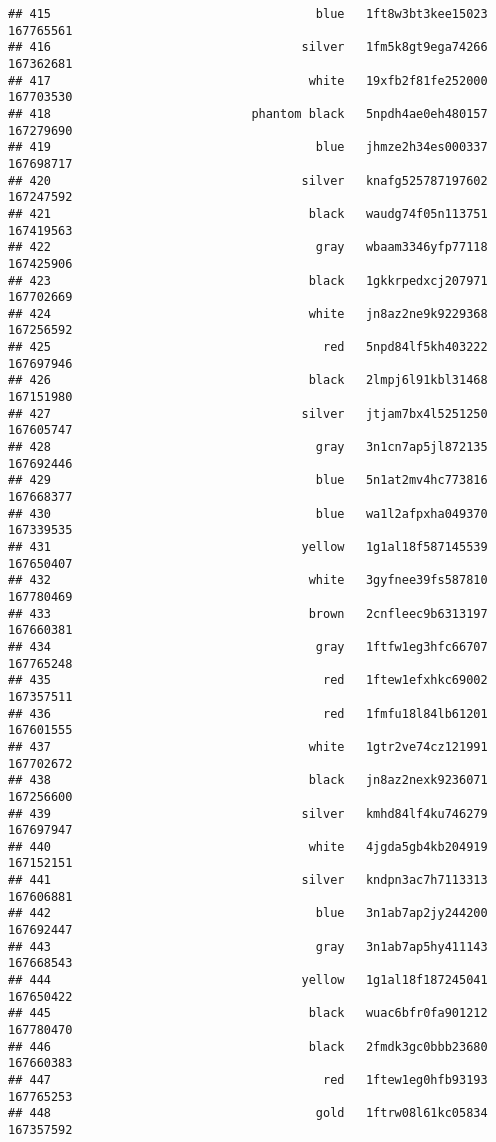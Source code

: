 \documentclass[
]{article}
\begin{document}
\begin{verbatim}
## 415                                     blue   1ft8w3bt3kee15023 167765561
## 416                                   silver   1fm5k8gt9ega74266 167362681
## 417                                    white   19xfb2f81fe252000 167703530
## 418                            phantom black   5npdh4ae0eh480157 167279690
## 419                                     blue   jhmze2h34es000337 167698717
## 420                                   silver   knafg525787197602 167247592
## 421                                    black   waudg74f05n113751 167419563
## 422                                     gray   wbaam3346yfp77118 167425906
## 423                                    black   1gkkrpedxcj207971 167702669
## 424                                    white   jn8az2ne9k9229368 167256592
## 425                                      red   5npd84lf5kh403222 167697946
## 426                                    black   2lmpj6l91kbl31468 167151980
## 427                                   silver   jtjam7bx4l5251250 167605747
## 428                                     gray   3n1cn7ap5jl872135 167692446
## 429                                     blue   5n1at2mv4hc773816 167668377
## 430                                     blue   wa1l2afpxha049370 167339535
## 431                                   yellow   1g1al18f587145539 167650407
## 432                                    white   3gyfnee39fs587810 167780469
## 433                                    brown   2cnfleec9b6313197 167660381
## 434                                     gray   1ftfw1eg3hfc66707 167765248
## 435                                      red   1ftew1efxhkc69002 167357511
## 436                                      red   1fmfu18l84lb61201 167601555
## 437                                    white   1gtr2ve74cz121991 167702672
## 438                                    black   jn8az2nexk9236071 167256600
## 439                                   silver   kmhd84lf4ku746279 167697947
## 440                                    white   4jgda5gb4kb204919 167152151
## 441                                   silver   kndpn3ac7h7113313 167606881
## 442                                     blue   3n1ab7ap2jy244200 167692447
## 443                                     gray   3n1ab7ap5hy411143 167668543
## 444                                   yellow   1g1al18f187245041 167650422
## 445                                    black   wuac6bfr0fa901212 167780470
## 446                                    black   2fmdk3gc0bbb23680 167660383
## 447                                      red   1ftew1eg0hfb93193 167765253
## 448                                     gold   1ftrw08l61kc05834 167357592

\end{verbatim}
\end{document}
